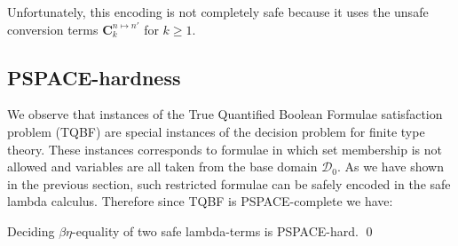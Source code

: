 Unfortunately, this encoding is not completely safe because it uses
the unsafe conversion terms $\mathbf{C}_k^{n\mapsto n'}$ for
$k\geq1$.



\subsection{PSPACE-hardness}
We observe that instances of the True Quantified Boolean Formulae
satisfaction problem (TQBF) are special instances of the decision
problem for finite type theory. These instances corresponds to
formulae in which set membership is not allowed and variables are
all taken from the base domain $\mathcal{D}_0$. As we have shown in
the previous section, such restricted formulae can be safely encoded
in the safe lambda calculus. Therefore since TQBF is
PSPACE-complete we have:
\begin{theorem}
\label{thm:pspacehardness}
 Deciding $\beta\eta$-equality of two safe lambda-terms is PSPACE-hard. \qed
\end{theorem}

